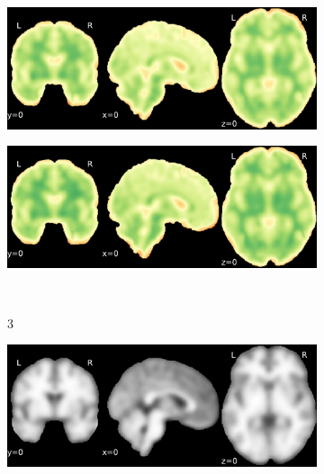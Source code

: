 \documentclass{article}
\begin{document}
\begin{appendices}
\begin{landscape}
\begin{figure}
\begin{subfigure}[t]{0.2\paperheight}
            \end{subfigure}
            \begin{subfigure}[t]{0.2\paperheight}
                \centering
                \includegraphics[width=\textwidth]{figures/sig/10mm/rs_ds001771_sub-36_sig.pdf}
            \end{subfigure}
            \begin{subfigure}[t]{0.2\paperheight}
                \centering
                \includegraphics[width=\textwidth]{figures/sig/10mm/rr.rs_ds001771_sub-36_sig.pdf}
            \end{subfigure} \\
            \begin{subfigure}[b][][c]{0.01\paperwidth} 3 \vspace*{15pt} \end{subfigure}
            \begin{subfigure}[t]{0.2\paperheight}
                \centering
                \includegraphics[width=\textwidth]{figures/sig/10mm/ieee_ds000256_sub-CTS201.pdf}

\end{subfigure}
\end{figure}
\end{landscape}
\end{appendices}
\end{document}
